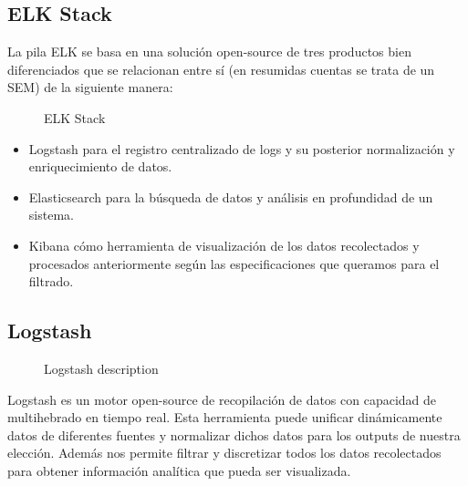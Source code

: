 \subsection{ELK Stack}

La pila ELK se basa en una solución open-source de tres productos bien diferenciados que se relacionan entre sí (en resumidas cuentas se trata de un SEM) de la siguiente manera:

\begin{figure}[H]
\caption{ELK Stack ~\cite{11}}
\end{figure}

\begin{itemize}
\item Logstash para el registro centralizado de logs y su posterior normalización y enriquecimiento de datos.
\item Elasticsearch para la búsqueda de datos y análisis en profundidad de un sistema.
\item Kibana cómo herramienta de visualización de los datos recolectados y procesados anteriormente según las especificaciones que queramos para el filtrado.
\end{itemize}

\subsection{Logstash}
\begin{figure}[H]
  \caption{Logstash description}
\end{figure}
Logstash es un motor open-source de recopilación de datos con capacidad de multihebrado en tiempo real. Esta herramienta puede unificar dinámicamente datos de diferentes fuentes y normalizar dichos datos para los outputs de nuestra elección. Además nos permite filtrar y discretizar todos los datos recolectados para obtener información analítica que pueda ser visualizada.\\

